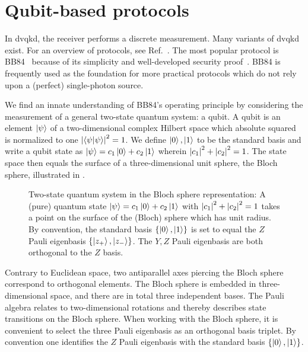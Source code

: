 \section{Qubit-based protocols}

In \gls{dvqkd}, the receiver performs a discrete measurement.
Many variants of \gls{dvqkd} exist. For an overview of protocols, see Ref.~\cite{Duvsek2006}.
The most popular protocol is BB84~\cite{Bennett1984} because of its simplicity and well-developed security proof~\cite{Shor2000}.
BB84 is frequently used as the foundation for more practical protocols which do not rely upon a (perfect) single-photon source.

We find an innate understanding of BB84's operating principle by considering the measurement of a general two-state quantum system: a qubit.
A qubit is an element $\ket{\psi}$ of a two-dimensional complex Hilbert space which absolute squared is normalized to one $\abs{\braket{\psi}}^2=1$.
We define $\ket{0},\ket{1}$ to be the standard basis and write a qubit state as $\ket{\psi}=c_1\ket{0}+c_2\ket{1}$ wherein $\abs{c_1}^2+\abs{c_2}^2=1$.
The state space then equals the surface of a three-dimensional unit sphere, the Bloch sphere, illustrated in .
\begin{figure}[htb]
	\centering
	
	\caption{Two-state quantum system in the Bloch sphere representation: A (pure) quantum state  $\ket{\psi}=c_1\ket{0}+c_2\ket{1}$ with $\abs{c_1}^2+\abs{c_2}^2=1$ takes a point on the surface of the (Bloch) sphere which has unit radius. By convention, the standard basis $\left\{\ket{0},\ket{1}\right\}$ is set to equal the $Z$ Pauli eigenbasis $\left\{\ket{z_+},\ket{z_-}\right\}$. The $Y,Z$ Pauli eigenbasis are both orthogonal to the $Z$ basis.}\label{fig:bloch_sphere}
\end{figure}
Contrary to Euclidean space, two antiparallel axes piercing the Bloch sphere correspond to orthogonal elements.
The Bloch sphere is embedded in three-dimensional space, and there are in total three independent bases.
The Pauli algebra relates to two-dimensional rotations and thereby describes state transitions on the Bloch sphere.
When working with the Bloch sphere, it is convenient to select the three Pauli eigenbasis as an orthogonal basis triplet.
By convention one identifies the $Z$ Pauli eigenbasis with the standard basis $\left\{\ket{0},\ket{1}\right\}$.

